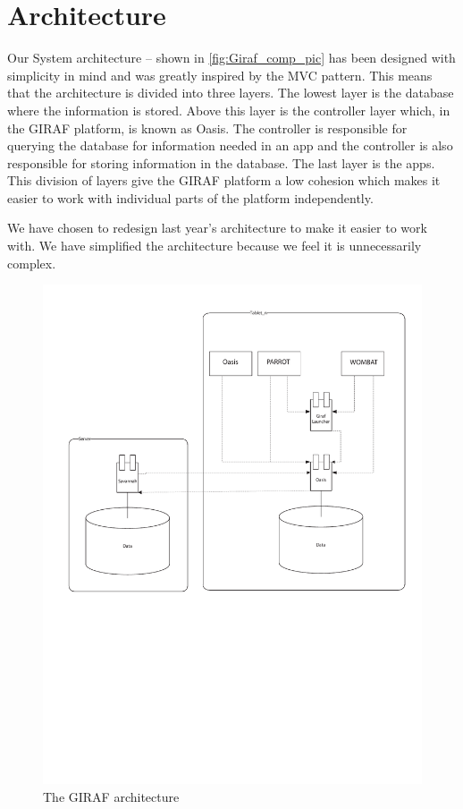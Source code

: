 \section{Architecture}
Our System architecture -- shown in \autoref{fig:Giraf_comp_pic} has been designed with simplicity in mind and was greatly inspired by the MVC pattern. This means that the architecture is divided into three layers. The lowest layer is the database where the information is stored. Above this layer is the controller layer which, in the GIRAF platform, is known as Oasis. The controller is responsible for querying the database for information needed in an app and the controller is also responsible for storing information in the database. The last layer is the apps. This division of layers give the GIRAF platform a low cohesion which makes it easier to work with individual parts of the platform independently.

We have chosen to redesign last year's architecture \cite{LastYearsArchitecture} to make it easier to work with. We have simplified the architecture because we feel it is unnecessarily complex.

\begin{figure}
	\centering
		\includegraphics[scale = 0.60]{input/images/Giraf_comp.pdf}
	\caption{The GIRAF architecture}
	\label{fig:Giraf_comp_pic}
\end{figure}
